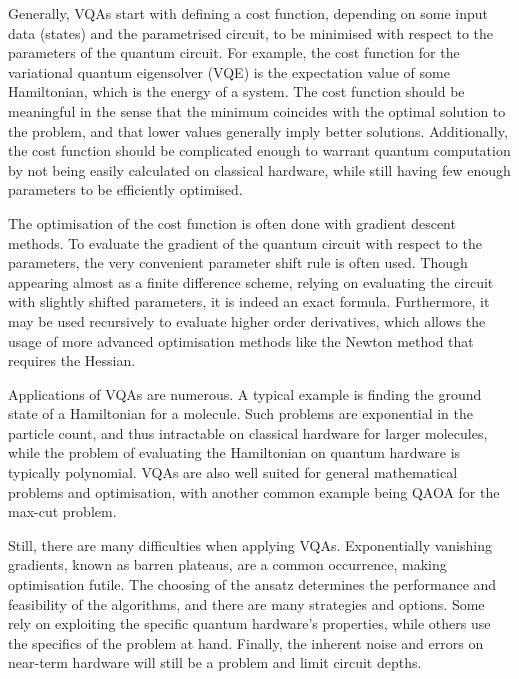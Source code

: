 Generally, VQAs start with defining a cost function, depending on some input data (states) and the parametrised circuit, to be minimised with respect to the parameters of the quantum circuit.
For example, the cost function for the variational quantum eigensolver (VQE) is the expectation value of some Hamiltonian, which is the energy of a system.
The cost function should be meaningful in the sense that the minimum coincides with the optimal solution to the problem, and that lower values generally imply better solutions.
Additionally, the cost function should be complicated enough to warrant quantum computation by not being easily calculated on classical hardware, while still having few enough parameters to be efficiently optimised.

The optimisation of the cost function is often done with gradient descent methods.
To evaluate the gradient of the quantum circuit with respect to the parameters, the very convenient parameter shift rule is often used.
Though appearing almost as a finite difference scheme, relying on evaluating the circuit with slightly shifted parameters, it is indeed an exact formula.
Furthermore, it may be used recursively to evaluate higher order derivatives, which allows the usage of more advanced optimisation methods like the Newton method that requires the Hessian.

Applications of VQAs are numerous.
A typical example is finding the ground state of a Hamiltonian for a molecule.
Such problems are exponential in the particle count, and thus intractable on classical hardware for larger molecules, while the problem of evaluating the Hamiltonian on quantum hardware is typically polynomial.
VQAs are also well suited for general mathematical problems and optimisation, with another common example being QAOA for the max-cut problem.

Still, there are many difficulties when applying VQAs.
Exponentially vanishing gradients, known as barren plateaus, are a common occurrence, making optimisation futile.
The choosing of the ansatz determines the performance and feasibility of the algorithms, and there are many strategies and options.
Some rely on exploiting the specific quantum hardware's properties, while others use the specifics of the problem at hand.
Finally, the inherent noise and errors on near-term hardware will still be a problem and limit circuit depths.